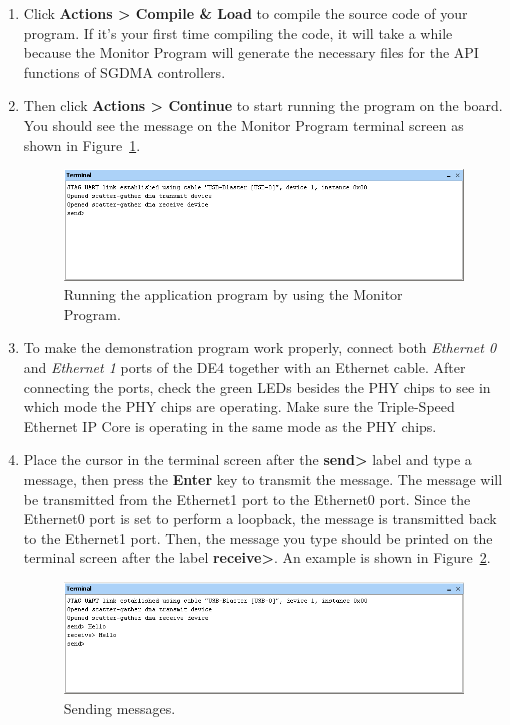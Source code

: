 \documentclass[11pt, twoside, pdftex]{article}
\begin{document}
\begin{enumerate}
	\item Click {\bf Actions > Compile \& Load} to compile the source code of your program. If it's your first time compiling the code, it will take a while because the Monitor Program will generate the necessary files for the API functions of SGDMA controllers. 
	
	\item Then click {\bf Actions > Continue} to start running the program on the board. You should see the message on the Monitor Program terminal screen as shown in Figure~\ref{fig:monitor_figure4}.
	
	\begin{figure}[H]
		\centering
		  \includegraphics[scale=0.75]{figures/monitor_figure4.png}
		\caption{Running the application program by using the Monitor Program.} 
		\label{fig:monitor_figure4}
	\end{figure}	
	
	\item To make the demonstration program work properly, connect both {\it Ethernet 0} and {\it Ethernet 1} ports of the DE4 together with an Ethernet cable. After connecting the ports, check the green LEDs besides the PHY chips to see in which mode the PHY chips are operating. Make sure the Triple-Speed Ethernet IP Core is operating in the same mode as the PHY chips. 
	
	\item Place the cursor in the terminal screen after the {\bf send>} label and type a message, then press the {\bf Enter} key to transmit the message. The message will be transmitted from the Ethernet1 port to the Ethernet0 port. Since the Ethernet0 port is set to perform a loopback, the message is transmitted back to the Ethernet1 port. Then, the message you type should be printed on the terminal screen after the label {\bf receive>}. An example is shown in Figure~\ref{fig:monitor_figure5}.

	\begin{figure}[H]
		\centering
		  \includegraphics[scale=0.75]{figures/monitor_figure5.png}
		\caption{Sending messages.} 
		\label{fig:monitor_figure5}
	\end{figure}

\end{enumerate}
\end{document}
